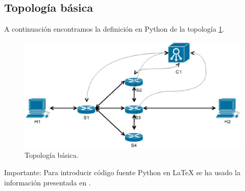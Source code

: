 \documentclass[a4paper,11pt]{book}
\begin{document}
\subsection{Topología básica}\label{ap:pythonBasic}
A continuación encontramos la definición en Python de la topología \ref{basicTopo}.
\begin{figure}[tb]
\centering
\includegraphics[scale=0.7]{./figuras/topoBasic}
\caption{Topología básica.}\label{basicTopo}
\end{figure}

Importante: Para introducir código fuente Python en LaTeX se ha usado la información presentada en \cite{pythonLatex}.
\end{document}

